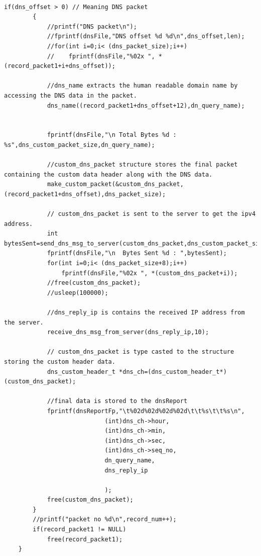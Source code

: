 \documentclass[12pt, a4paper]{report}
\begin{document}
\begin{lstlisting}[caption={Processing the DNS packet, DNS querying and storing the results}]

if(dns_offset > 0) // Meaning DNS packet
        {
            //printf("DNS packet\n");
            //fprintf(dnsFile,"DNS offset %d %d\n",dns_offset,len);
            //for(int i=0;i< (dns_packet_size);i++)
            //    fprintf(dnsFile,"%02x ", *(record_packet1+i+dns_offset));

            //dns_name extracts the human readable domain name by accessing the DNS data in the packet.
            dns_name((record_packet1+dns_offset+12),dn_query_name);
            

            fprintf(dnsFile,"\n Total Bytes %d : %s",dns_custom_packet_size,dn_query_name);

            //custom_dns_packet structure stores the final packet containing the custom data header along with the DNS data.
            make_custom_packet(&custom_dns_packet,(record_packet1+dns_offset),dns_packet_size);

            // custom_dns_packet is sent to the server to get the ipv4 address.
            int bytesSent=send_dns_msg_to_server(custom_dns_packet,dns_custom_packet_size);
            fprintf(dnsFile,"\n  Bytes Sent %d : ",bytesSent);
            for(int i=0;i< (dns_packet_size+8);i++)
                fprintf(dnsFile,"%02x ", *(custom_dns_packet+i));
            //free(custom_dns_packet);
            //usleep(100000);

            //dns_reply_ip is contains the received IP address from the server.
            receive_dns_msg_from_server(dns_reply_ip,10);

            // custom_dns_packet is type casted to the structure storing the custom header data.
            dns_custom_header_t *dns_ch=(dns_custom_header_t*)(custom_dns_packet);

            //final data is stored to the dnsReport
            fprintf(dnsReportFp,"\t%02d%02d%02d%02d\t\t%s\t\t%s\n",
                            (int)dns_ch->hour,
                            (int)dns_ch->min,
                            (int)dns_ch->sec,
                            (int)dns_ch->seq_no,
                            dn_query_name,
                            dns_reply_ip

                            );
            free(custom_dns_packet);                
        }
        //printf("packet no %d\n",record_num++);
        if(record_packet1 != NULL)
            free(record_packet1);
    }

\end{lstlisting}
\end{document}

